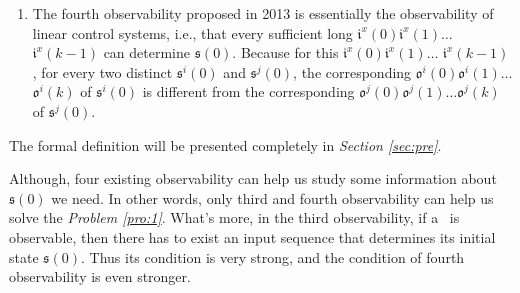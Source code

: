 \begin{enumerate}
	\item  The fourth observability proposed in 2013 \cite{Fornasini2013Observability} is essentially the observability of linear control systems, i.e., that every sufficient long $\mathfrak{i}^{x}(0)$$\mathfrak{i}^{x}(1)\ldots$ $\mathfrak{i}^{x}(k-1)$ can determine $\mathfrak{s}(0)$. Because for this $\mathfrak{i}^{x}(0)$$\mathfrak{i}^{x}(1)\ldots$ $\mathfrak{i}^{x}(k-1)$, for every two distinct $\mathfrak{s}^{i}(0)$ and $\mathfrak{s}^{j}(0)$, the corresponding $\mathfrak{o}^{i}(0)$$\mathfrak{o}^{i}(1)\ldots$$\mathfrak{o}^{i}(k)$ of $\mathfrak{s}^{i}(0)$ is different from the corresponding $\mathfrak{o}^{j}(0)$$\mathfrak{o}^{j}(1)\ldots$$\mathfrak{o}^{j}(k)$ of $\mathfrak{s}^{j}(0)$.%
\end{enumerate}
 The formal definition will be presented completely in {\em Section \ref{sec:pre}}.

Although, four existing observability can help us study some information about $\mathfrak{s}(0)$ we need. %
In other words, only third and fourth observability can help us solve the {\em Problem \ref{pro:1}}. What's more, in the third observability, if a \BCN\ is observable, then there has to exist an input sequence that determines its initial state $\mathfrak{s}(0)$. Thus its condition is very strong, and the condition of fourth observability is even stronger. 


